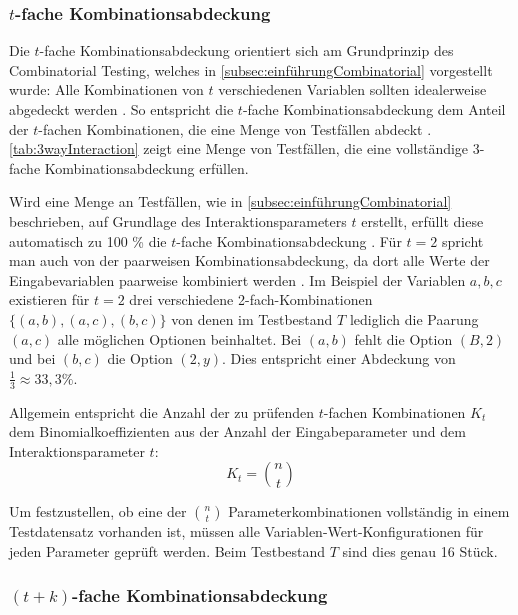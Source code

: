 \subsubsection{$t$-fache Kombinationsabdeckung}\label{subsub:TAbdeckung}

Die $t$-fache Kombinationsabdeckung orientiert sich am Grundprinzip des Combinatorial Testing, welches in \autoref{subsec:einführungCombinatorial} vorgestellt wurde: Alle Kombinationen von $t$ verschiedenen Variablen sollten idealerweise abgedeckt werden \cite{kuhn2010practical}. So entspricht die $t$-fache Kombinationsabdeckung dem Anteil der $t$-fachen Kombinationen, die eine Menge von Testfällen abdeckt \cite{kuhn2010practical}. \autoref{tab:3wayInteraction} zeigt eine Menge von Testfällen, die eine vollständige 3-fache Kombinationsabdeckung erfüllen.
 
Wird eine Menge an Testfällen, wie in \autoref{subsec:einführungCombinatorial} beschrieben, auf Grundlage des Interaktionsparameters $t$ erstellt, erfüllt diese automatisch zu 100 \% die $t$-fache Kombinationsabdeckung \cite{kuhn2010practical}. Für $t = 2$ spricht man auch von der paarweisen Kombinationsabdeckung, da dort alle Werte der Eingabevariablen paarweise kombiniert werden \cite{kuhn2010practical}. Im Beispiel der Variablen $a,b,c$ existieren für $t = 2$ drei verschiedene 2-fach-Kombinationen $\{(a,b), (a,c), (b,c)\}$ von denen im Testbestand $T$ lediglich die Paarung $(a,c)$ alle möglichen Optionen beinhaltet. Bei $(a,b)$ fehlt die Option $(B,2)$ und bei $(b,c)$ die Option $(2,y)$. Dies entspricht einer Abdeckung von $\frac{1}{3} \approx 33,3 \%$. 

Allgemein entspricht die Anzahl der zu prüfenden $t$-fachen Kombinationen $K_t$ dem Binomialkoeffizienten aus der Anzahl der Eingabeparameter und dem Interaktionsparameter $t$:
\[
K_t = \binom{n}{t}
\]

Um festzustellen, ob eine der $\binom{n}{t}$ Parameterkombinationen vollständig in einem Testdatensatz vorhanden ist, müssen alle Variablen-Wert-Konfigurationen für jeden Parameter geprüft werden. Beim Testbestand $T$ sind dies genau 16 Stück.

\subsubsection{$(t+k)$-fache Kombinationsabdeckung}\label{subsub:tPlusKAbdeckung}

